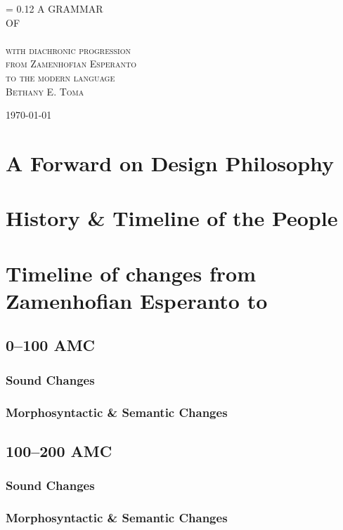 \documentclass[a4paper,11pt,twoside,openany]{memoir}
\newlength{\drop}%
\newcommand*{\titleAM}{\begingroup%
\drop = 0.12\textheight
\centering
\vspace*{\drop}
{\Huge A GRAMMAR}\\[\baselineskip]
{\Large OF}\\[\baselineskip]
{\Huge \langname{}}\\[\baselineskip]
{\scshape with diachronic progression}\\
{\scshape from Zamenhofian Esperanto}\\
{\scshape to the modern language}\\[2.5\drop]

{\small\scshape Bethany E. Toma}\par
{\small\scshape \today}\par
\vfill\null
\endgroup}
\begin{document}
\begin{titlingpage}
\titleAM
\clearpage
\end{titlingpage}
\frontmatter
\tableofcontents
\chapter{A Forward on Design Philosophy}
\chapter{History \& Timeline of the \peoplegroup{} People}
\mainmatter

\chapter{Timeline of changes from Zamenhofian Esperanto to \langname{}}

\section{0--100 AMC}

\subsection{Sound Changes}



\subsection{Morphosyntactic \& Semantic Changes}



\section{100--200 AMC}

\subsection{Sound Changes}



\subsection{Morphosyntactic \& Semantic Changes}
\end{document}
